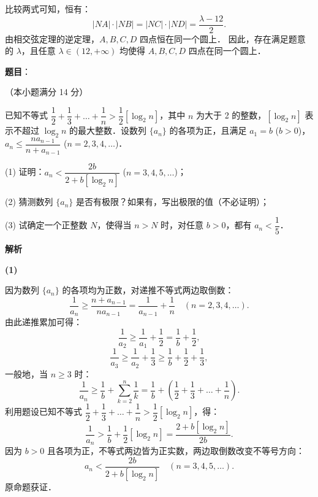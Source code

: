 \begin{answer}
比较两式可知，恒有：
\nopagebreak[4]
\[
|NA| \cdot |NB| = |NC| \cdot |ND| = \frac{\lambda - 12}{2}.
\]
由相交弦定理的逆定理，$A, B, C, D$ 四点恒在同一个圆上．
因此，存在满足题意的 $\lambda$，且任意 $\lambda \in (12, +\infty)$ 均使得 $A, B, C, D$ 四点在同一个圆上．



\end{answer}
\begin{answer}

\textbf{题目}：

（本小题满分 14 分）

已知不等式 $\dfrac{1}{2} + \dfrac{1}{3} + \dots + \dfrac{1}{n} > \dfrac{1}{2}[\log_2 n]$，其中 $n$ 为大于 2 的整数，$[\log_2 n]$ 表示不超过 $\log_2 n$ 的最大整数．设数列 $\{a_n\}$ 的各项为正，且满足 $a_1 = b$ ($b > 0$)，$a_n \leqslant \dfrac{n a_{n-1}}{n + a_{n-1}}$ ($n = 2, 3, 4, \dots$)．

(1) 证明：$a_n < \dfrac{2b}{2 + b[\log_2 n]}$ ($n = 3, 4, 5, \dots$)；

(2) 猜测数列 $\{a_n\}$ 是否有极限？如果有，写出极限的值（不必证明）；

(3) 试确定一个正整数 $N$，使得当 $n > N$ 时，对任意 $b > 0$，都有 $a_n < \dfrac{1}{5}$．

\textbf{解析}

\textbf{(1)}

因为数列 $\{a_n\}$ 的各项均为正数，对递推不等式两边取倒数：
\nopagebreak[4]
\[
\frac{1}{a_n} \geqslant \frac{n + a_{n-1}}{n a_{n-1}} = \frac{1}{a_{n-1}} + \frac{1}{n} \quad (n = 2, 3, 4, \dots).
\]
由此递推累加可得：
\nopagebreak[4]
\[
\frac{1}{a_2} \geqslant \frac{1}{a_1} + \frac{1}{2} = \frac{1}{b} + \frac{1}{2},
\]
\nopagebreak[4]
\[
\frac{1}{a_3} \geqslant \frac{1}{a_2} + \frac{1}{3} \geqslant \frac{1}{b} + \frac{1}{2} + \frac{1}{3},
\]
一般地，当 $n \geqslant 3$ 时：
\nopagebreak[4]
\[
\frac{1}{a_n} \geqslant \frac{1}{b} + \sum_{k=2}^n \frac{1}{k} = \frac{1}{b} + \left(\frac{1}{2} + \frac{1}{3} + \dots + \frac{1}{n}\right).
\]
利用题设已知不等式 $\dfrac{1}{2} + \dfrac{1}{3} + \dots + \dfrac{1}{n} > \dfrac{1}{2}[\log_2 n]$，得：
\nopagebreak[4]
\[
\frac{1}{a_n} > \frac{1}{b} + \frac{1}{2}[\log_2 n] = \frac{2 + b[\log_2 n]}{2b}.
\]
因为 $b > 0$ 且各项为正，不等式两边皆为正实数，两边取倒数改变不等号方向：
\nopagebreak[4]
\[
a_n < \frac{2b}{2 + b[\log_2 n]} \quad (n = 3, 4, 5, \dots).
\]
原命题获证．


\end{answer}
